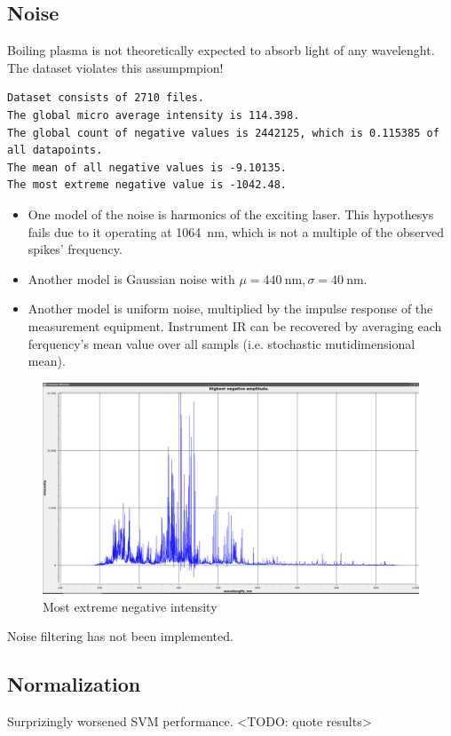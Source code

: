 \documentclass{article}
\begin{document}
\subsection{Noise}
Boiling plasma is not theoretically expected to absorb light of any wavelenght.
The dataset violates this assumpmpion!
\par
\begin{verbatim}
Dataset consists of 2710 files.
The global micro average intensity is 114.398.
The global count of negative values is 2442125, which is 0.115385 of all datapoints.
The mean of all negative values is -9.10135.
The most extreme negative value is -1042.48.
\end{verbatim}
\begin{itemize}
\item{One model of the noise is harmonics of the exciting laser.
This hypothesys fails due to it operating at \SI{1064}{\nano\metre}, which is not a multiple of the observed spikes' frequency.}
\item{Another model is Gaussian noise with $\mu=\SI{440}{\nano\metre}, \sigma=\SI{40}{\nano\metre}$.}
\item{Another model is uniform noise, multiplied by the impulse response of the measurement equipment.
Instrument IR can be recovered by averaging each ferquency's mean value over all sampls (i.e. stochastic mutidimensional mean).}
\end{itemize}
\begin{figure}
\caption{Most extreme negative intensity}
\centering
\includegraphics[width=1.25\textwidth]{img/negatives}
\end{figure}
Noise filtering has not been implemented.


\subsection{Normalization}
Surprizingly worsened SVM performance. <TODO: quote results>
\end{document}
